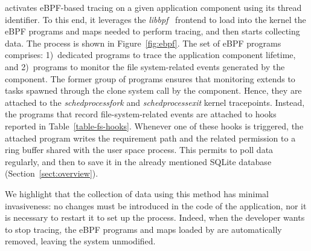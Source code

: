 \dmng activates eBPF-based tracing on a given application component
using its thread identifier. To this end, it leverages the {\em
  libbpf}~\cite{libbpf-doc} frontend to load into the kernel the eBPF
programs and maps needed to perform tracing, and then starts
collecting data. The process is shown in Figure~\ref{fig:ebpf}.  The
set of eBPF programs comprises: 1)~dedicated programs to trace the
application component lifetime, and 2)~programs to monitor the file
system-related events generated by the component. The former group of
programs ensures that monitoring extends to tasks spawned through the
clone system call by the component. Hence, they are attached to the
{\em sched\textunderscore process\textunderscore fork} and {\em
  sched\textunderscore process\textunderscore exit} kernel
tracepoints. Instead, the programs that record file-system-related
events are attached to hooks reported in
Table~\ref{table-fs-hooks}. Whenever one of these hooks is triggered,
the attached program writes the requirement path and the related
permission to a ring buffer shared with the \dmng user space
process. This permits \dmng to poll data regularly, and then to save it
in the already mentioned SQLite database
(Section~\ref{sect:overview}).

We highlight that the collection of data using this method has minimal
invasiveness: no changes must be introduced in the code of the
application, nor it is necessary to restart it to set up the process.
Indeed, when the developer wants to stop tracing, the eBPF programs
and maps loaded by \dmng are automatically removed, leaving the system
unmodified.

